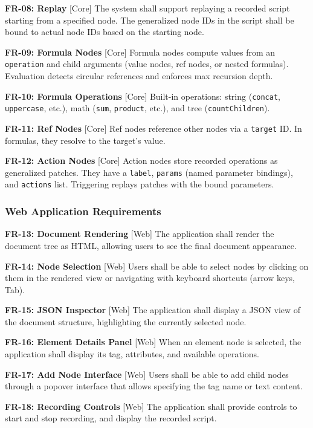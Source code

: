 \documentclass{article}
\begin{document}
\textbf{FR-08: Replay} [Core] The system shall support replaying a recorded script starting from a specified node. The generalized node IDs in the script shall be bound to actual node IDs based on the starting node.

\textbf{FR-09: Formula Nodes} [Core] Formula nodes compute values from an \texttt{operation} and child arguments (value nodes, ref nodes, or nested formulas). Evaluation detects circular references and enforces max recursion depth.

\textbf{FR-10: Formula Operations} [Core] Built-in operations: string (\texttt{concat}, \texttt{uppercase}, etc.), math (\texttt{sum}, \texttt{product}, etc.), and tree (\texttt{countChildren}).

\textbf{FR-11: Ref Nodes} [Core] Ref nodes reference other nodes via a \texttt{target} ID. In formulas, they resolve to the target's value.

\textbf{FR-12: Action Nodes} [Core] Action nodes store recorded operations as generalized patches. They have a \texttt{label}, \texttt{params} (named parameter bindings), and \texttt{actions} list. Triggering replays patches with the bound parameters.

\subsubsection{Web Application Requirements}

\textbf{FR-13: Document Rendering} [Web] The application shall render the document tree as HTML, allowing users to see the final document appearance.

\textbf{FR-14: Node Selection} [Web] Users shall be able to select nodes by clicking on them in the rendered view or navigating with keyboard shortcuts (arrow keys, Tab).

\textbf{FR-15: JSON Inspector} [Web] The application shall display a JSON view of the document structure, highlighting the currently selected node.

\textbf{FR-16: Element Details Panel} [Web] When an element node is selected, the application shall display its tag, attributes, and available operations.

\textbf{FR-17: Add Node Interface} [Web] Users shall be able to add child nodes through a popover interface that allows specifying the tag name or text content.

\textbf{FR-18: Recording Controls} [Web] The application shall provide controls to start and stop recording, and display the recorded script.
\end{document}
